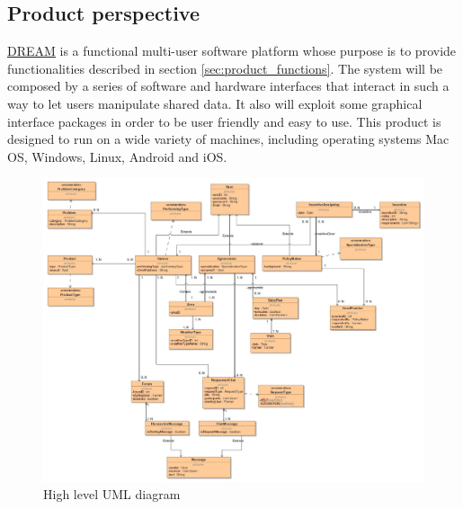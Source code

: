 
\subsection{Product perspective}
\label{sec:prod_perspective}
\hyperref[tab:acronymsTable]{DREAM} is a functional multi-user software platform whose purpose is to provide functionalities described in section \ref{sec:product_functions}. The system will be composed by a series of software and hardware interfaces that interact in such a way to let users manipulate shared data. It also will exploit some graphical interface packages in order to be user friendly and easy to use.
This product is designed to run on a wide variety of machines, including operating systems Mac OS, Windows, Linux, Android and iOS. 

\begin{figure}[H]
	\centering
    \includegraphics[page=1, width=\textwidth]{Images/uml.JPG}
	\caption{\label{fig:uml_class_diagram}High level UML diagram}
\end{figure}


